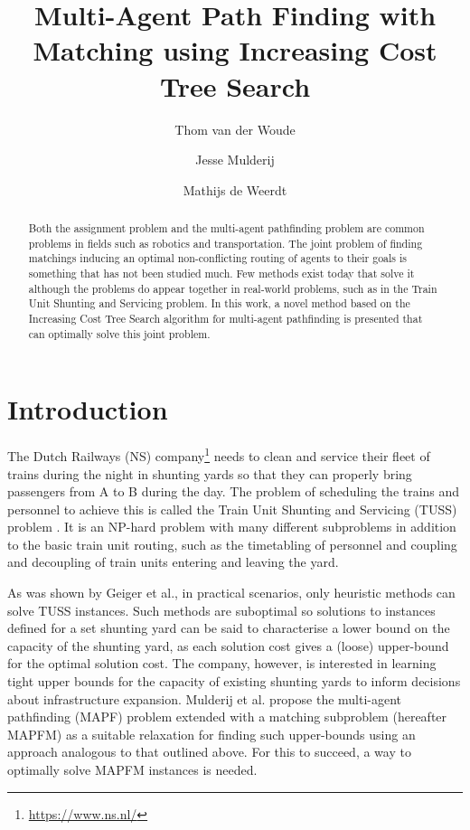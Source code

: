 \documentclass[english]{article}
\begin{document}
	
	\title{Multi-Agent Path Finding with Matching using Increasing Cost Tree Search}
	
	\author{Thom van der Woude\and Jesse Mulderij\and Mathijs de Weerdt}
	\date{}
	
	\maketitle
	
	\begin{abstract}
		Both the assignment problem and the multi-agent pathfinding problem are common problems in fields such as robotics and transportation. The joint problem of finding matchings inducing an optimal non-conflicting routing of agents to their goals is something that has not been studied much. Few methods exist today that solve it although the problems do appear together in real-world problems, such as in the Train Unit Shunting and Servicing problem. In this work, a novel method based on the Increasing Cost Tree Search algorithm for multi-agent pathfinding is presented that can optimally solve this joint problem.
	\end{abstract}
	
	\section{Introduction}
	The Dutch Railways (NS) company\footnote{\url{https://www.ns.nl/}} needs to clean and service their fleet of trains during the night in shunting yards so that they can properly bring passengers from A to B during the day. 
	The problem of scheduling the trains and personnel to achieve this is called the Train Unit Shunting and Servicing (TUSS) problem \cite{mulderij2020}. 
	It is an NP-hard problem with many different subproblems in addition to the basic train unit routing, such as the timetabling of personnel and coupling and decoupling of train units entering and leaving the yard. %
	
	As was shown by Geiger et al.\cite{geiger2018}, in practical scenarios, only heuristic methods can solve TUSS instances. 
	Such methods are suboptimal so solutions to instances defined for a set shunting yard can be
 said to characterise a lower bound on the capacity of the shunting yard, as each solution cost gives a (loose) upper-bound for the optimal solution cost. 
	The company, however, is interested in learning tight upper bounds for the capacity of existing shunting yards to inform decisions about infrastructure expansion. 
	Mulderij et al. \cite{mulderij2020} propose the multi-agent pathfinding (MAPF) problem \cite{stern2019} extended with a matching subproblem (hereafter MAPFM) as a suitable relaxation for finding such upper-bounds using an approach analogous to that outlined above.
	For this to succeed, a way to optimally solve MAPFM instances is needed.
\end{document}
